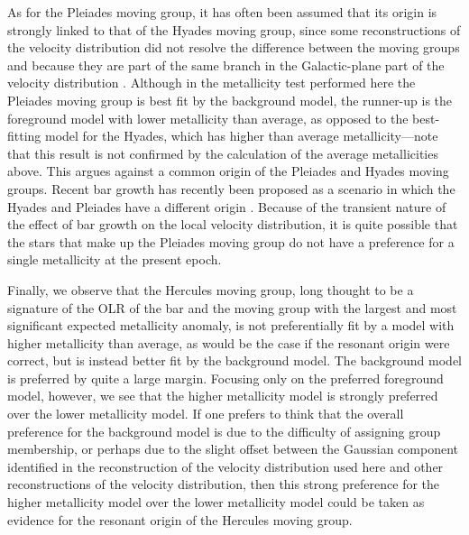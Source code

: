 As for the Pleiades moving group, it has often been assumed that its
origin is strongly linked to that of the Hyades moving group, since
some reconstructions of the velocity distribution did not resolve the
difference between the moving groups \citep{2005A&A...430..165F} and
because they are part of the same branch in the Galactic-plane part of
the velocity distribution \citep{1999MNRAS.308..731S}. Although in the
metallicity test performed here the Pleiades moving group is best fit
by the background model, the runner-up is the foreground model with
lower metallicity than average, as opposed to the best-fitting model
for the Hyades, which has higher than average metallicity---note that
this result is not confirmed by the calculation of the average
metallicities above. This argues against a common origin of the
Pleiades and Hyades moving groups. Recent bar growth has recently been
proposed as a scenario in which the Hyades and Pleiades have a
different origin \citep{Minchev09a}. Because of the transient nature
of the effect of bar growth on the local velocity distribution, it is
quite possible that the stars that make up the Pleiades moving group
do not have a preference for a single metallicity at the present
epoch.

Finally, we observe that the Hercules moving group, long thought to be
a signature of the OLR of the bar and the moving group with the
largest and most significant expected metallicity anomaly, is not
preferentially fit by a model with higher metallicity than average, as
would be the case if the resonant origin were correct, but is instead
better fit by the background model. The background model is preferred
by quite a large margin. Focusing only on the preferred foreground
model, however, we see that the higher metallicity model is strongly
preferred over the lower metallicity model. If one prefers to think
that the overall preference for the background model is due to the
difficulty of assigning group membership, or perhaps due to the slight
offset between the Gaussian component identified in the reconstruction
of the velocity distribution used here and other reconstructions of
the velocity distribution, then this strong preference for the higher
metallicity model over the lower metallicity model could be taken as
evidence for the resonant origin of the Hercules moving group.

